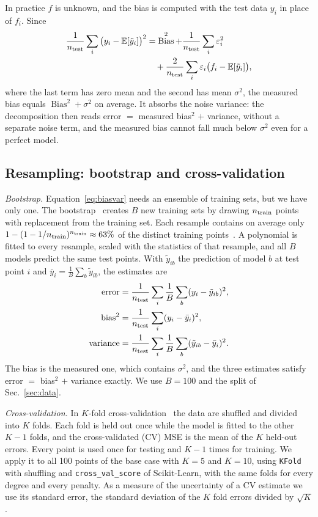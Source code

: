 \documentclass[aps,reprint,amsmath,amssymb,nofootinbib,floatfix]{revtex4-2}
\newcommand{\E}{\mathbb{E}}
\DeclareMathOperator{\Bias}{Bias}
\begin{document}
In practice $f$ is unknown, and the bias is computed with the test data $y_i$ in place of $f_i$.
Since
\begin{align}
  \frac{1}{n_{\rm test}}\sum_i\big(y_i-\E[\tilde y_i]\big)^2
  &=\Bias^2+\frac{1}{n_{\rm test}}\sum_i\varepsilon_i^2 \nonumber\\
  &\quad+\frac{2}{n_{\rm test}}\sum_i\varepsilon_i\big(f_i-\E[\tilde y_i]\big),
\end{align}
where the last term has zero mean and the second has mean $\sigma^2$, the measured bias equals
$\Bias^2+\sigma^2$ on average. It absorbs the noise variance: the decomposition then reads error
$=$ measured bias$^2$ $+$ variance, without a separate noise term, and the measured bias cannot
fall much below $\sigma^2$ even for a perfect model.

\subsection{Resampling: bootstrap and cross-validation}\label{sec:resampling}

\emph{Bootstrap.} Equation~\eqref{eq:biasvar} needs an ensemble of training sets, but we have only
one. The bootstrap~\cite{efron1979} creates $B$ new training sets by drawing $n_{\rm train}$ points
with replacement from the training set. Each resample contains on average only
$1-(1-1/n_{\rm train})^{n_{\rm train}}\approx63\%$ of the distinct training
points~\cite{hjorthjensen2026}. A polynomial is fitted to every resample, scaled with the statistics
of that resample, and all $B$ models predict the same test points. With $\tilde y_{ib}$ the
prediction of model $b$ at test point $i$ and $\bar y_i=\frac1B\sum_b\tilde y_{ib}$, the estimates
are
\begin{align}
  \text{error}&=\frac{1}{n_{\rm test}}\sum_i\frac1B\sum_b(y_i-\tilde y_{ib})^2,\nonumber\\
  \text{bias}^2&=\frac{1}{n_{\rm test}}\sum_i(y_i-\bar y_i)^2,\label{eq:bootest}\\
  \text{variance}&=\frac{1}{n_{\rm test}}\sum_i\frac1B\sum_b(\tilde y_{ib}-\bar y_i)^2.\nonumber
\end{align}
The bias is the measured one, which contains $\sigma^2$, and the three estimates satisfy error $=$
bias$^2$ $+$ variance exactly. We use $B=100$ and the split of Sec.~\ref{sec:data}.

\emph{Cross-validation.} In $K$-fold cross-validation~\cite{hastie2009} the data are shuffled and
divided into $K$ folds. Each fold is held out once while the model is fitted to the other $K-1$
folds, and the cross-validated (CV) MSE is the mean of the $K$ held-out errors. Every point is used
once for testing and $K-1$ times for training. We apply it to all 100 points of the base case with
$K=5$ and $K=10$, using \texttt{KFold} with shuffling and \texttt{cross\_val\_score} of
Scikit-Learn, with the same folds for every degree and every penalty. As a measure of the
uncertainty of a CV estimate we use its standard error, the standard deviation of the $K$ fold
errors divided by $\sqrt K$.
\end{document}
